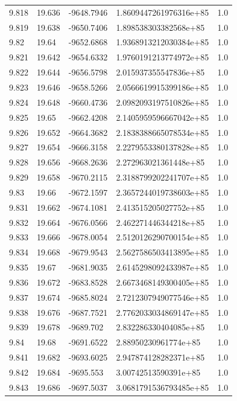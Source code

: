 \begin{tabular}{lllll}
9.818 & 19.636 & -9648.7946 & 1.8609447261976316e+85 & 1.0 \\
9.819 & 19.638 & -9650.7406 & 1.898538303382568e+85 & 1.0 \\
9.82 & 19.64 & -9652.6868 & 1.9368913212030384e+85 & 1.0 \\
9.821 & 19.642 & -9654.6332 & 1.9760191213774972e+85 & 1.0 \\
9.822 & 19.644 & -9656.5798 & 2.015937355547836e+85 & 1.0 \\
9.823 & 19.646 & -9658.5266 & 2.0566619915399186e+85 & 1.0 \\
9.824 & 19.648 & -9660.4736 & 2.0982093197510826e+85 & 1.0 \\
9.825 & 19.65 & -9662.4208 & 2.1405959596667042e+85 & 1.0 \\
9.826 & 19.652 & -9664.3682 & 2.1838388665078534e+85 & 1.0 \\
9.827 & 19.654 & -9666.3158 & 2.2279553380137828e+85 & 1.0 \\
9.828 & 19.656 & -9668.2636 & 2.272963021361448e+85 & 1.0 \\
9.829 & 19.658 & -9670.2115 & 2.3188799202241707e+85 & 1.0 \\
9.83 & 19.66 & -9672.1597 & 2.3657244019738603e+85 & 1.0 \\
9.831 & 19.662 & -9674.1081 & 2.413515205027752e+85 & 1.0 \\
9.832 & 19.664 & -9676.0566 & 2.462271446344218e+85 & 1.0 \\
9.833 & 19.666 & -9678.0054 & 2.5120126290700154e+85 & 1.0 \\
9.834 & 19.668 & -9679.9543 & 2.5627586503413895e+85 & 1.0 \\
9.835 & 19.67 & -9681.9035 & 2.6145298092433987e+85 & 1.0 \\
9.836 & 19.672 & -9683.8528 & 2.6673468149300405e+85 & 1.0 \\
9.837 & 19.674 & -9685.8024 & 2.7212307949077546e+85 & 1.0 \\
9.838 & 19.676 & -9687.7521 & 2.7762033034869147e+85 & 1.0 \\
9.839 & 19.678 & -9689.702 & 2.832286330404085e+85 & 1.0 \\
9.84 & 19.68 & -9691.6522 & 2.88950230961774e+85 & 1.0 \\
9.841 & 19.682 & -9693.6025 & 2.947874128282371e+85 & 1.0 \\
9.842 & 19.684 & -9695.553 & 3.00742513590391e+85 & 1.0 \\
9.843 & 19.686 & -9697.5037 & 3.0681791536793485e+85 & 1.0 \\

\end{tabular}
